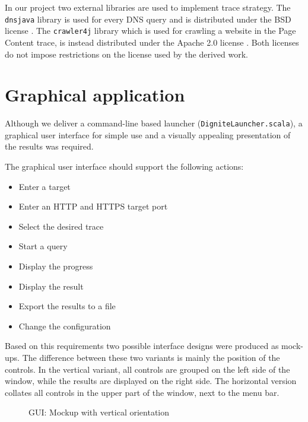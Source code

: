 \documentclass[
	a4paper,					10pt,							twoside,					openright,				notitlepage,			parskip=half,			]{scrreprt}
\begin{document}
In our project two external libraries are used to implement trace strategy.
The \verb|dnsjava| library is used for every \gls{DNS} query and is distributed under the BSD license \cite{license:bsd}.
The \verb|crawler4j| library which is used for crawling a website in the Page Content trace, is instead distributed under the Apache 2.0 license \cite{license:apache2}.
Both licenses do not impose restrictions on the license used by the derived work.

\clearpage{}
\clearpage{}\chapter{Graphical application} \label{chap:demoapp}



Although we deliver a command-line based launcher (\verb|DigniteLauncher.scala|), 
a graphical user interface for simple use and a visually appealing presentation 
of the results was required. 

The graphical user interface should support the following actions:

\begin{itemize}
\item{Enter a target}
\item{Enter an \gls{HTTP} and \gls{HTTPS} target port}
\item{Select the desired trace}
\item{Start a query}
\item{Display the progress}
\item{Display the result}
\item{Export the results to a file}
\item{Change the configuration}
\end{itemize}

Based on this requirements two possible interface designs were produced as mock-ups. 
The difference between these two variants is mainly the position of the controls. 
In the vertical variant, all controls are grouped on the left side of the window, 
while the results are displayed on the right side. The horizontal version collates all
controls in the upper part of the window, next to the menu bar. 

\begin{figure}[H] 
\caption{\gls{GUI}: Mockup with vertical orientation}
\label{fig:guimockvert}
\end{figure}
\end{document}
